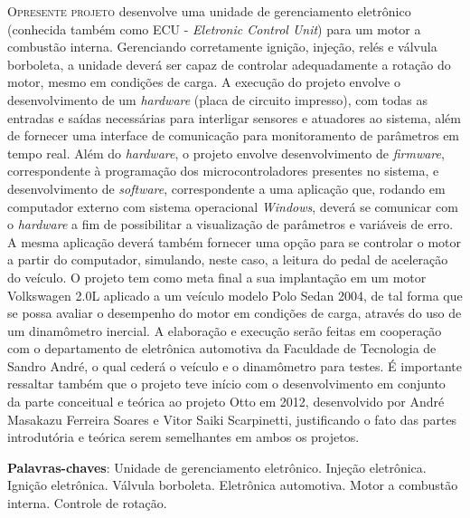 
\lettrine{O}{presente projeto} desenvolve uma unidade de gerenciamento eletrônico (conhecida também como ECU - \textit{Eletronic Control Unit}) para um motor a combustão interna. Gerenciando corretamente ignição, injeção, relés e válvula borboleta, a unidade deverá ser capaz de controlar adequadamente a rotação do motor, mesmo em condições de carga. A execução do projeto envolve o desenvolvimento de um \textit{hardware} (placa de circuito impresso), com todas as entradas e saídas necessárias para interligar sensores e atuadores ao sistema, além de fornecer uma interface de comunicação para monitoramento de parâmetros em tempo real. Além do \textit{hardware}, o projeto envolve desenvolvimento de \textit{firmware}, correspondente à programação dos microcontroladores presentes no sistema, e desenvolvimento de \textit{software}, correspondente a uma aplicação que, rodando em computador externo com sistema operacional \textit{Windows}, deverá se comunicar com o \textit{hardware} a fim de possibilitar a visualização de parâmetros e variáveis de erro. A mesma aplicação deverá também fornecer uma opção para se controlar o motor a partir do computador, simulando, neste caso, a leitura do pedal de aceleração do veículo. O projeto tem como meta final a sua implantação em um motor Volkswagen 2.0L aplicado a um veículo modelo Polo Sedan 2004, de tal forma que se possa avaliar o desempenho do motor em condições de carga, através do uso de um dinamômetro inercial. A elaboração e execução serão feitas em cooperação com o departamento de eletrônica automotiva da Faculdade de Tecnologia de Sandro André, o qual cederá o veículo e o dinamômetro para testes. É importante ressaltar também que o projeto teve início com o desenvolvimento em conjunto da parte conceitual e teórica ao projeto Otto \cite{andre2012} em 2012, desenvolvido por André Masakazu Ferreira Soares e Vitor Saiki Scarpinetti, justificando o fato das partes introdutória e teórica serem semelhantes em ambos os projetos.

	\textbf{Palavras-chaves}: Unidade de gerenciamento eletrônico. Injeção eletrônica. Ignição eletrônica. Válvula borboleta. Eletrônica automotiva. Motor a combustão interna. Controle de rotação.

